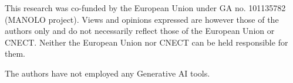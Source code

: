 \documentclass[twocolumn]{ceurart}
\begin{document}
\begin{acknowledgments}
This research was co-funded by the European Union under GA no. 101135782 (MANOLO project). Views and opinions expressed are however those of the authors only and do not necessarily reflect those of the European Union or CNECT. Neither the European Union nor CNECT can be held responsible for them.
\end{acknowledgments}

\begin{aideclaration}
    The authors have not employed any Generative AI tools.
\end{aideclaration}

% 


\end{document}
